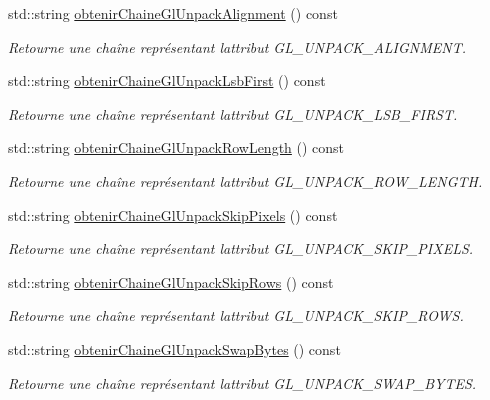 \begin{DoxyCompactItemize}
std\+::string \hyperlink{group__utilitaire_gabcc3fe54f0a5f429af71e1bacef5a9c9}{obtenir\+Chaine\+Gl\+Unpack\+Alignment} () const 
\begin{DoxyCompactList}\small\item\em Retourne une chaîne représentant l\textquotesingle{}attribut G\+L\+\_\+\+U\+N\+P\+A\+C\+K\+\_\+\+A\+L\+I\+G\+N\+M\+E\+N\+T. \end{DoxyCompactList}\item 
std\+::string \hyperlink{group__utilitaire_ga5de4612f68058b5bc47576fc64f97004}{obtenir\+Chaine\+Gl\+Unpack\+Lsb\+First} () const 
\begin{DoxyCompactList}\small\item\em Retourne une chaîne représentant l\textquotesingle{}attribut G\+L\+\_\+\+U\+N\+P\+A\+C\+K\+\_\+\+L\+S\+B\+\_\+\+F\+I\+R\+S\+T. \end{DoxyCompactList}\item 
std\+::string \hyperlink{group__utilitaire_gaefbf6604571a413d33c117cb1c170a79}{obtenir\+Chaine\+Gl\+Unpack\+Row\+Length} () const 
\begin{DoxyCompactList}\small\item\em Retourne une chaîne représentant l\textquotesingle{}attribut G\+L\+\_\+\+U\+N\+P\+A\+C\+K\+\_\+\+R\+O\+W\+\_\+\+L\+E\+N\+G\+T\+H. \end{DoxyCompactList}\item 
std\+::string \hyperlink{group__utilitaire_gaa0abd9dc2b1158d657d9553424732bb8}{obtenir\+Chaine\+Gl\+Unpack\+Skip\+Pixels} () const 
\begin{DoxyCompactList}\small\item\em Retourne une chaîne représentant l\textquotesingle{}attribut G\+L\+\_\+\+U\+N\+P\+A\+C\+K\+\_\+\+S\+K\+I\+P\+\_\+\+P\+I\+X\+E\+L\+S. \end{DoxyCompactList}\item 
std\+::string \hyperlink{group__utilitaire_gaa4065b05943d7e949fd785f85dd3cdc2}{obtenir\+Chaine\+Gl\+Unpack\+Skip\+Rows} () const 
\begin{DoxyCompactList}\small\item\em Retourne une chaîne représentant l\textquotesingle{}attribut G\+L\+\_\+\+U\+N\+P\+A\+C\+K\+\_\+\+S\+K\+I\+P\+\_\+\+R\+O\+W\+S. \end{DoxyCompactList}\item 
std\+::string \hyperlink{group__utilitaire_gaa9b797c3176f4a4cb2094550ebaab4d9}{obtenir\+Chaine\+Gl\+Unpack\+Swap\+Bytes} () const 
\begin{DoxyCompactList}\small\item\em Retourne une chaîne représentant l\textquotesingle{}attribut G\+L\+\_\+\+U\+N\+P\+A\+C\+K\+\_\+\+S\+W\+A\+P\+\_\+\+B\+Y\+T\+E\+S. \end{DoxyCompactList}\item 

\end{DoxyCompactItemize}
